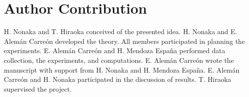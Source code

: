 \documentclass[smallextended,natbib]{svjour3}       %
\begin{document}
\date{Received: date / Accepted: date}

\maketitle

\section*{Author Contribution}

H. Nonaka and T. Hiraoka conceived of the presented idea. H. Nonaka and E. Alemán Carreón developed the theory. All members participated in planning the experiments. E. Alemán Carreón and H. Mendoza España performed data collection, the experiments, and computations. E. Alemán Carreón wrote the manuscript with support from H. Nonaka and H. Mendoza España. E. Alemán Carreón and H. Nonaka participated in the discussion of results. T. Hiraoka supervised the project. 
\end{document}
